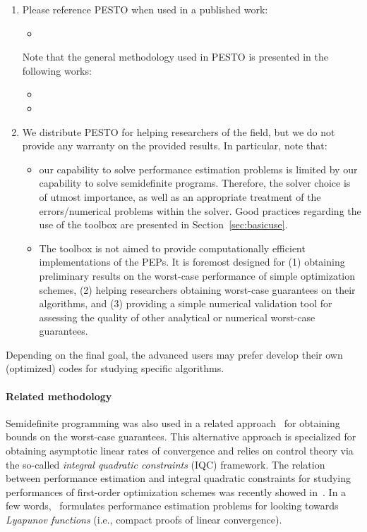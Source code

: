 \documentclass[11pt,a4paper]{article}
\newcommand{\pesto}{{PESTO }}
\begin{document}
	\begin{enumerate}
		\item Please reference \pesto when used in a published work:
		\begin{itemize}
			\item {}
		\end{itemize}
		Note that the general methodology used in \pesto is presented in the following works:
		\begin{itemize}
			\item {}
			\item {}
		\end{itemize}
		\item We distribute \pesto  for helping researchers of the field, but we do not provide any warranty on the provided results. In particular, note that:
		\begin{itemize}
			\item our capability to solve performance estimation problems is limited by our capability to solve semidefinite programs. Therefore, the solver choice is of utmost importance, as well as an appropriate treatment of the errors/numerical problems within the solver. Good practices regarding the use of the toolbox are presented in Section~\ref{sec:basicuse}.
			\item The toolbox is not aimed to provide computationally efficient implementations of the PEPs. It is foremost designed for (1) obtaining preliminary results on the worst-case performance of simple optimization schemes, (2) helping researchers obtaining worst-case guarantees on their algorithms, and (3) providing a simple numerical validation tool for assessing the quality of other analytical or numerical worst-case guarantees.
		\end{itemize}
	\end{enumerate}

	Depending on the final goal, the advanced users may prefer develop their own (optimized) codes for studying specific algorithms.
	\paragraph{Related methodology} Semidefinite programming was also used in a related approach~\cite{lessard2014analysis} for obtaining bounds on the worst-case guarantees. This alternative approach is specialized for obtaining asymptotic linear rates of convergence and relies on control theory via the so-called \emph{integral quadratic constraints} (IQC) framework. The relation between performance estimation and integral quadratic constraints for studying performances of first-order optimization schemes was recently showed in~\cite{taylor2018lyapunov}. In a few words,~\cite{taylor2018lyapunov} formulates performance estimation problems for looking towards \emph{Lyapunov functions} (i.e., compact proofs of linear convergence).
\end{document}
